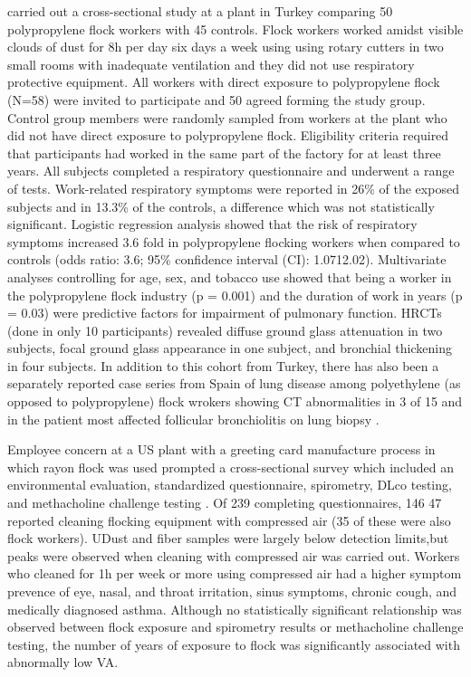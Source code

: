 \documentclass[a4paper,12pt]{article}
\begin{document}
\cite{Atis2005} carried out a cross-sectional study at a plant in Turkey comparing 50 polypropylene flock workers with 45 controls. Flock workers worked amidst visible clouds of dust for 8h per day six days a week using using rotary cutters in two small rooms with inadequate ventilation and they did not use respiratory protective equipment. All workers with direct exposure to polypropylene flock (N=58) were invited to participate and 50 agreed forming the study group. Control group members were randomly sampled from workers at the plant who did not have direct exposure to polypropylene flock. Eligibility criteria required that participants had worked in the same part of the factory for at least three years. All subjects completed a respiratory questionnaire and underwent a range of tests. Work-related respiratory symptoms were reported in 26\% of the exposed subjects and in 13.3\% of the controls, a difference which was not statistically significant. Logistic regression analysis showed that the risk of respiratory symptoms increased 3.6 fold in polypropylene flocking workers when compared to controls (odds ratio: 3.6; 95\% confidence interval (CI): 1.0712.02). Multivariate analyses controlling for age, sex, and tobacco use showed that being a worker in the polypropylene flock industry (p = 0.001) and the duration of work in years (p = 0.03) were predictive factors for impairment of pulmonary function. HRCTs (done in only 10 participants) revealed diffuse ground glass attenuation in two subjects, focal ground glass appearance in one subject, and bronchial thickening in four subjects. In addition to this cohort from Turkey, there has also been a separately reported case series from Spain of lung disease among polyethylene (as opposed to polypropylene) flock wrokers showing CT abnormalities in 3 of 15 and in the patient most affected follicular bronchiolitis on lung biopsy \cite{Barroso2002}	.

Employee concern at a US plant with a greeting card manufacture process in which rayon flock was used prompted a cross-sectional survey which included an environmental evaluation, standardized questionnaire, spirometry, DLco testing, and methacholine challenge testing \cite{Antao2007}. Of 239 completing questionnaires, 146 47 reported cleaning flocking equipment with compressed air (35 of these were also flock workers). UDust and fiber samples were largely below detection limits,but peaks were observed when cleaning with compressed air was carried out. Workers who cleaned for 1h per week or more using compressed air had a higher symptom prevence of eye, nasal, and throat irritation, sinus symptoms, chronic cough, and medically diagnosed asthma. Although no statistically significant relationship was observed between flock exposure and spirometry results or methacholine challenge testing,  the number of years of exposure to flock was significantly associated with abnormally low VA.
\end{document}
